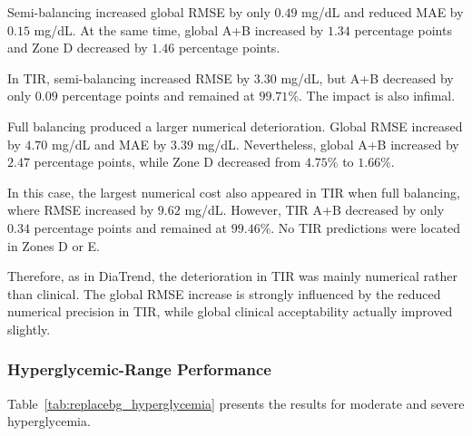 Semi-balancing increased global RMSE by only \(0.49\) mg/dL and reduced MAE by \(0.15\) mg/dL. At the same time, global A+B increased by \(1.34\) percentage points and Zone D decreased by \(1.46\) percentage points.

In TIR, semi-balancing increased RMSE by \(3.30\) mg/dL, but A+B decreased by only \(0.09\) percentage points and remained at \(99.71\%\). The impact is also infimal.

Full balancing produced a larger numerical deterioration. Global RMSE increased by \(4.70\) mg/dL and MAE by \(3.39\) mg/dL. Nevertheless, global A+B increased by \(2.47\) percentage points, while Zone D decreased
from \(4.75\%\) to \(1.66\%\).

In this case, the largest numerical cost also appeared in TIR when full balancing, where RMSE increased by \(9.62\) mg/dL. However, TIR A+B decreased by only \(0.34\) percentage points and remained at \(99.46\%\). No TIR predictions were located in Zones D or E.

Therefore, as in DiaTrend, the deterioration in TIR was mainly numerical rather than clinical. The global RMSE increase is strongly influenced by the reduced numerical precision in TIR, while global clinical acceptability actually improved slightly.

\subsubsection{Hyperglycemic-Range Performance}
\label{subsubsec:replacebg_hyperglycemia}

Table~\ref{tab:replacebg_hyperglycemia} presents the results for moderate and severe hyperglycemia.


